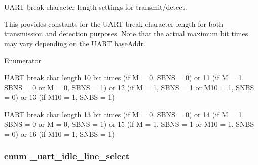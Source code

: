 U\+A\+RT break character length settings for transmit/detect. 

This provides constants for the U\+A\+RT break character length for both transmission and detection purposes. Note that the actual maximum bit times may vary depending on the U\+A\+RT base\+Addr. \begin{Desc}
\item[Enumerator]\par
\begin{description}
\item[{\em 
k\+Uart\+Break\+Char10\+Bit\+Minimum\hypertarget{group__uart__hal_ggafc836c7460339592ca74ec409835dabba00828d8cd2c2715b3a32f704af22c98c}{}\label{group__uart__hal_ggafc836c7460339592ca74ec409835dabba00828d8cd2c2715b3a32f704af22c98c}
}]U\+A\+RT break char length 10 bit times (if M = 0, S\+B\+NS = 0) or 11 (if M = 1, S\+B\+NS = 0 or M = 0, S\+B\+NS = 1) or 12 (if M = 1, S\+B\+NS = 1 or M10 = 1, S\+N\+BS = 0) or 13 (if M10 = 1, S\+N\+BS = 1) \item[{\em 
k\+Uart\+Break\+Char13\+Bit\+Minimum\hypertarget{group__uart__hal_ggafc836c7460339592ca74ec409835dabba2b24dc75d0a4ec4945cc3ec466e0c339}{}\label{group__uart__hal_ggafc836c7460339592ca74ec409835dabba2b24dc75d0a4ec4945cc3ec466e0c339}
}]U\+A\+RT break char length 13 bit times (if M = 0, S\+B\+NS = 0) or 14 (if M = 1, S\+B\+NS = 0 or M = 0, S\+B\+NS = 1) or 15 (if M = 1, S\+B\+NS = 1 or M10 = 1, S\+N\+BS = 0) or 16 (if M10 = 1, S\+N\+BS = 1) \end{description}
\end{Desc}
\subsubsection[{\texorpdfstring{\+\_\+uart\+\_\+idle\+\_\+line\+\_\+select}{_uart_idle_line_select}}]{\setlength{\rightskip}{0pt plus 5cm}enum {\bf \+\_\+uart\+\_\+idle\+\_\+line\+\_\+select}}\hypertarget{group__uart__hal_gafcbb35202aa124845649edb0607d994d}{}\label{group__uart__hal_gafcbb35202aa124845649edb0607d994d}


